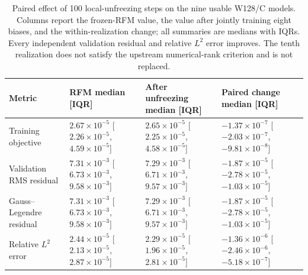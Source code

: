 \begin{table}[t]
\centering
\scriptsize
\setlength{\tabcolsep}{3pt}
\renewcommand{\arraystretch}{1.12}
\begin{tabular}{@{}lp{}p{}p{}@{}}
\hline
Metric & RFM median [IQR] & After unfreezing median [IQR] & Paired change median [IQR] \\
\hline
Training objective & $2.67\times10^{-5}$ [$2.26\times10^{-5}$,$4.59\times10^{-5}$] & $2.65\times10^{-5}$ [$2.25\times10^{-5}$,$4.58\times10^{-5}$] & $-1.37\times10^{-7}$ [$-2.03\times10^{-7}$,$-9.81\times10^{-8}$] \\
Validation RMS residual & $7.31\times10^{-3}$ [$6.73\times10^{-3}$,$9.58\times10^{-3}$] & $7.29\times10^{-3}$ [$6.71\times10^{-3}$,$9.57\times10^{-3}$] & $-1.87\times10^{-5}$ [$-2.78\times10^{-5}$,$-1.03\times10^{-5}$] \\
Gauss--Legendre residual & $7.31\times10^{-3}$ [$6.73\times10^{-3}$,$9.58\times10^{-3}$] & $7.29\times10^{-3}$ [$6.71\times10^{-3}$,$9.57\times10^{-3}$] & $-1.87\times10^{-5}$ [$-2.78\times10^{-5}$,$-1.03\times10^{-5}$] \\
Relative $L^2$ error & $2.44\times10^{-5}$ [$2.13\times10^{-5}$,$2.87\times10^{-5}$] & $2.29\times10^{-5}$ [$1.96\times10^{-5}$,$2.81\times10^{-5}$] & $-1.36\times10^{-6}$ [$-2.46\times10^{-6}$,$-5.18\times10^{-7}$] \\
\hline
\end{tabular}
\caption{Paired effect of 100 local-unfreezing steps on the nine usable W128/C models.  Columns report the frozen-RFM value, the value after jointly training eight biases, and the within-realization change; all summaries are medians with IQRs.  Every independent validation residual and relative $L^2$ error improves.  The tenth realization does not satisfy the upstream numerical-rank criterion and is not replaced.}
\label{tab:application-unfreezing}
\end{table}
